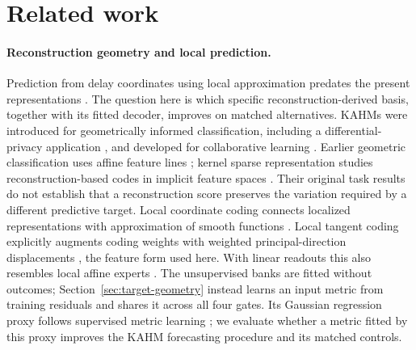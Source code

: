 \section{Related work}\label{sec:related}
\paragraph{Reconstruction geometry and local prediction.}
Prediction from delay coordinates using local approximation predates the
present representations \citep{Farmer1987Prediction}. The question here is
which specific reconstruction-derived basis, together with its fitted
decoder, improves on matched alternatives.
KAHMs were introduced for geometrically informed classification, including
a differential-privacy application \citep{Kumar2024KAHM}, and developed for
collaborative learning \citep{Kumar2025Collaborative}. Earlier geometric
classification uses affine feature lines \citep{Li1999FeatureLine}; kernel
sparse representation studies reconstruction-based codes in implicit feature
spaces \citep{Gao2010KernelSparse}. Their original task results do not
establish that a reconstruction score preserves the variation required by
a different predictive target. Local coordinate coding connects localized
representations with approximation of smooth functions \citep{Yu2009LCC}.
Local tangent coding explicitly augments coding weights with weighted
principal-direction displacements \citep{Yu2010LTC}, the feature form used
here. With linear readouts this also resembles local affine experts
\citep{Jacobs1991Experts}. The unsupervised banks are fitted without outcomes;
Section~\ref{sec:target-geometry} instead learns an input metric from
training residuals and shares it across all four gates. Its Gaussian
regression proxy follows supervised metric learning
\citep{Weinberger2007Metric}; we evaluate whether a metric fitted by this proxy improves the KAHM
forecasting procedure and its matched controls.

